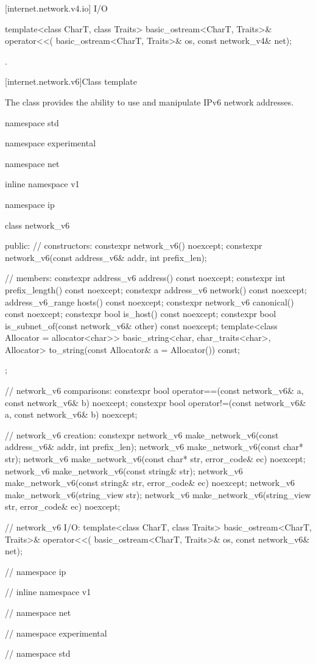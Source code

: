[internet.network.v4.io]{ I/O}

\begin{itemdecl}
template<class CharT, class Traits>
  basic_ostream<CharT, Traits>& operator<<(
    basic_ostream<CharT, Traits>& os, const network_v4& net);
\end{itemdecl}

\begin{itemdescr}
\pnum
\returns {}.
\end{itemdescr}




%
[internet.network.v6]{Class template }

\pnum
The class  provides the ability to use and manipulate IPv6 network addresses.

\begin{codeblock}
namespace std {
namespace experimental {
namespace net {
inline namespace v1 {
namespace ip {

  class network_v6
  {
  public:
    // constructors:
    constexpr network_v6() noexcept;
    constexpr network_v6(const address_v6& addr, int prefix_len);

    // members:
    constexpr address_v6 address() const noexcept;
    constexpr int prefix_length() const noexcept;
    constexpr address_v6 network() const noexcept;
    address_v6_range hosts() const noexcept;
    constexpr network_v6 canonical() const noexcept;
    constexpr bool is_host() const noexcept;
    constexpr bool is_subnet_of(const network_v6& other) const noexcept;
    template<class Allocator = allocator<char>>
      basic_string<char, char_traits<char>, Allocator>
        to_string(const Allocator& a = Allocator()) const;
  };

  // network_v6 comparisons:
  constexpr bool operator==(const network_v6& a, const network_v6& b) noexcept;
  constexpr bool operator!=(const network_v6& a, const network_v6& b) noexcept;

  // network_v6 creation:
  constexpr network_v6 make_network_v6(const address_v6& addr, int prefix_len);
  network_v6 make_network_v6(const char* str);
  network_v6 make_network_v6(const char* str, error_code& ec) noexcept;
  network_v6 make_network_v6(const string& str);
  network_v6 make_network_v6(const string& str, error_code& ec) noexcept;
  network_v6 make_network_v6(string_view str);
  network_v6 make_network_v6(string_view str, error_code& ec) noexcept;

  // network_v6 I/O:
  template<class CharT, class Traits>
    basic_ostream<CharT, Traits>& operator<<(
      basic_ostream<CharT, Traits>& os, const network_v6& net);

} // namespace ip
} // inline namespace v1
} // namespace net
} // namespace experimental
} // namespace std
\end{codeblock}


